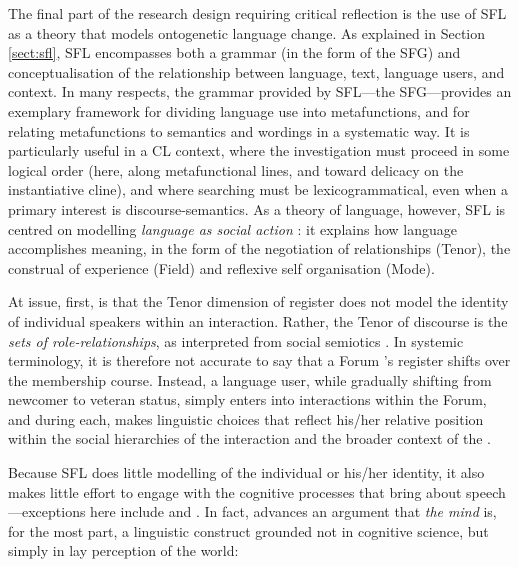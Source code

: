 The final part of the research design requiring critical reflection is the use of \gls{SFL} as a theory that models ontogenetic language change. As explained in Section \ref{sect:sfl}, \gls{SFL} encompasses both a grammar (in the form of the \gls{SFG}) and conceptualisation of the relationship between language, text, language users, and context. In many respects, the grammar provided by \gls{SFL}---the \gls{SFG}---provides an exemplary framework for dividing language use into metafunctions, and for relating metafunctions to semantics and wordings in a systematic way. It is particularly useful in a \gls{CL} context, where the investigation must proceed in some logical order (here, along metafunctional lines, and toward delicacy on the instantiative cline), and where searching must be lexicogrammatical, even when a primary interest is \glspl{discourse-semantic}. As a theory of language, however, \gls{SFL} is centred on modelling \emph{language as social action} \cite{halliday1978language}: it explains how language accomplishes meaning, in the form of the negotiation of relationships (Tenor), the construal of experience (Field) and reflexive self organisation (Mode).

At issue, first, is that the Tenor dimension of register does not model the identity of individual speakers within an interaction. Rather, the Tenor of discourse is the \emph{sets of role\hyp{}relationships}, as interpreted from social semiotics \cite{halliday_language_1989}. In systemic terminology, it is therefore not accurate to say that a \gls{Forum} 's register shifts over the membership course. Instead, a language user, while gradually shifting from newcomer to veteran status, simply enters into interactions within the \gls{Forum}, and during each, makes linguistic choices that reflect his\slash her relative position within the social hierarchies of the interaction and the broader context of the .

Because \gls{SFL} does little modelling of the individual or his\slash her identity, it also makes little effort to engage with the cognitive processes that bring about speech---exceptions here include \textcite{crocker2016information} and \textcite{degaetano-ortlieb_data_2014}. In fact, \textcite{matthiessen1998construing} advances an argument that \emph{the mind} is, for the most part, a linguistic construct grounded not in cognitive science, but simply in lay perception of the world:

